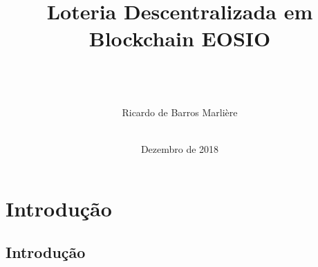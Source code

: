 \documentclass[11pt, red]{beamer}
\title[Loteria em EOSIO]{\large{Loteria Descentralizada em Blockchain EOSIO} }
\author[Ricardo de Barros Marli\`ere]{
    {\small \textcolor[rgb]{0.00,0.00,0.63}{\textit{ \ }}}\\
    \vspace{0.2cm}
    {\small \textcolor[rgb]{0.00,0.00,0.63}{\textit{ \ }}}\\
    {\color{black} \text{} }\\
    {\color{black} Ricardo de Barros Marli\`ere }\\
    {\color{black} \ }\\
  }
\institute[UFJF]{Universidade Federal de Juiz de Fora}
\date{Dezembro de 2018}
\begin{document}

\begin{frame}[plain]
    \titlepage
\end{frame}


\section[ ]{Introdu\c{c}\~{a}o}

\subsection[Introdu\c{c}\~{a}o]{Introdu\c{c}\~{a}o}
\end{document}
